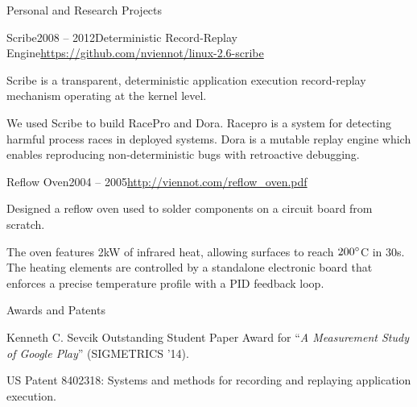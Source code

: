 \documentclass{resume} %
\begin{document}
\begin{rSection}{Personal and Research Projects}
\begin{rSubsection}{Scribe}{2008 -- 2012}{Deterministic Record-Replay Engine}{\url{https://github.com/nviennot/linux-2.6-scribe}}
\item Scribe is a transparent, deterministic application execution record-replay mechanism operating at the kernel level.
\item We used Scribe to build RacePro and Dora. Racepro is a system for detecting harmful process races in deployed systems.
Dora is a mutable replay engine which enables reproducing non-deterministic bugs with retroactive debugging.
\end{rSubsection}

\begin{rSubsection}{Reflow Oven}{2004 -- 2005}{\url{http://viennot.com/reflow\_oven.pdf}}{}
\item Designed a reflow oven used to solder components on a circuit board from scratch.
\item The oven features 2kW of infrared heat, allowing surfaces to reach
      $200\degree$C in 30s. The heating elements are controlled by a standalone
      electronic board that enforces a precise temperature profile with a PID feedback loop.
\end{rSubsection}

\end{rSection}


\begin{rSection}{Awards and Patents}
\begin{rList}
\item Kenneth C. Sevcik Outstanding Student Paper Award for ``{\em A Measurement Study of Google Play}'' (SIGMETRICS '14).
\item US Patent 8402318: Systems and methods for recording and replaying application execution.
\end{rList}
\end{rSection}

\end{document}
